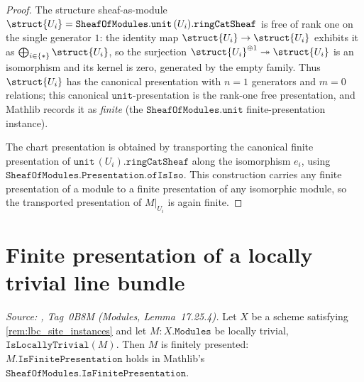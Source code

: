 \begin{proof}
  \leanok
  The structure sheaf-as-module \(\struct{U_i} = \mathtt{SheafOfModules.unit}\,
  (U_i).\mathtt{ringCatSheaf}\) is free of rank one on the single generator
  \(1\): the identity map \(\struct{U_i} \to \struct{U_i}\) exhibits it as
  \(\bigoplus_{i \in \{*\}} \struct{U_i}\), so the surjection
  \(\struct{U_i}^{\oplus 1} \twoheadrightarrow \struct{U_i}\) is an isomorphism
  and its kernel is zero, generated by the empty family. Thus \(\struct{U_i}\)
  has the canonical presentation with \(n = 1\) generators and \(m = 0\)
  relations; this canonical \(\mathtt{unit}\)-presentation is the rank-one free
  presentation, and Mathlib records it as \emph{finite} (the
  \(\mathtt{SheafOfModules.unit}\) finite-presentation instance).

  The chart presentation is obtained by transporting the canonical finite
  presentation of \(\mathtt{unit}\,(U_i).\mathtt{ringCatSheaf}\) along the
  isomorphism \(e_i\), using \(\mathtt{SheafOfModules.Presentation.ofIsIso}\).
  This construction carries any finite presentation of a module to a finite
  presentation of any isomorphic module, so the transported presentation of
  \(M|_{U_i}\) is again finite.
\end{proof}

\section{Finite presentation of a locally trivial line bundle}
\label{sec:lbc_finite_presentation}

\begin{theorem}\leanok
  \label{thm:lbc_isFinitePresentation}
  \textit{Source: \cite{stacks-project}, Tag~0B8M (Modules, Lemma~17.25.4).}
  Let \(X\) be a scheme satisfying \cref{rem:lbc_site_instances} and let
  \(M : X.\mathtt{Modules}\) be locally trivial, \(\texttt{IsLocallyTrivial}(M)\). Then
  \(M\) is finitely presented: \(M.\mathtt{IsFinitePresentation}\) holds in
  Mathlib's \(\mathtt{SheafOfModules.IsFinitePresentation}\).
\end{theorem}

